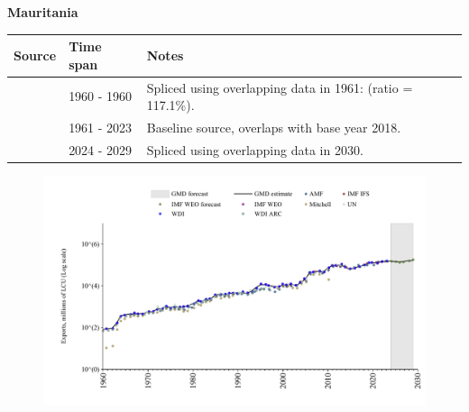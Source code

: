 \documentclass[12pt,a4paper,landscape]{article}
\begin{document}
\begin{adjustbox}{max totalsize={\paperwidth}{\paperheight},center}
\begin{minipage}[t][\textheight][t]{\textwidth}
\vspace*{0.5cm}
{}
\begin{center}
{\Large\bfseries Mauritania}
\end{center}
\vspace{0.5cm}
\begin{table}[H]
\centering
\small
\begin{tabular}{|l|l|l|}
\hline
\textbf{Source} & \textbf{Time span} & \textbf{Notes} \\
\hline
\rowcolor{white}\cite{WDI_ARC}& 1960 - 1960 &Spliced using overlapping data in 1961: (ratio = 117.1\%).\\
\rowcolor{lightgray}\cite{WDI}& 1961 - 2023 &Baseline source, overlaps with base year 2018.\\
\rowcolor{white}\cite{IMF_WEO_forecast}& 2024 - 2029 &Spliced using overlapping data in 2030.\\
\hline
\end{tabular}
\end{table}
\begin{figure}[H]
\centering
\includegraphics[width=\textwidth,height=0.6\textheight,keepaspectratio]{graphs/MRT_exports.pdf}
\end{figure}
\end{minipage}
\end{adjustbox}
\end{document}
